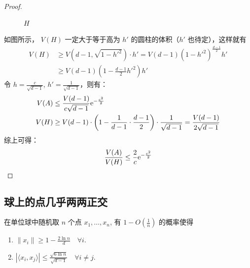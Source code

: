 \begin{proof}
\begin{figure}[htbp]
        \caption{$H$}
    \end{figure}
    
    如图所示， $V(H)$ 一定大于等于高为 $h'$ 的圆柱的体积（$h'$ 也待定），这样就有
    \begin{align*}
    	V(H) &\ge V(d-1,\sqrt{1-h'^{2}})\cdot h' = V(d-1)(1-h'^{2})^{\frac{d-1}{2}}h' \\
    	&\ge V(d-1)\left(1-\frac{d-1}{2}h'^{2}\right)h'
    \end{align*}
    令 $h=\frac{c}{\sqrt{d-1}}$, $h'=\frac{1}{\sqrt{d-1}}$，则有：
    \begin{align*}
    	V(A) &\le\frac{V(d-1)}{c\sqrt{d-1}}\mathrm{e}^{-\frac{c^{2}}{2}} \\
    	V(H) &\ge V(d-1)\cdot\left(1-\frac{1}{d-1}\cdot\frac{d-1}{2}\right)\cdot\frac{1}{\sqrt{d-1}}=\frac{V(d-1)}{2\sqrt{d-1}}
    \end{align*}
    综上可得：
    \[
    	\frac{V(A)}{V(H)}\le\frac{2}{c}\mathrm{e}^{-\frac{c^{2}}{2}}
    \]
\end{proof}

\subsection{球上的点几乎两两正交}

\begin{theorem}
    在单位球中随机取 $n$ 个点 $x_1, \dots, x_n$, 有 $1 - O(\frac{1}{n})$ 的概率使得
    \begin{enumerate}
    	\item $\|x_i\| \ge 1 - \frac{2 \ln n}{d} \quad \forall i$.
    	\item $|\langle x_i, x_j \rangle| \le \frac{\sqrt{6 \ln n}}{\sqrt{d-1}} \quad \forall i \neq j$.
    \end{enumerate}
\end{theorem}


